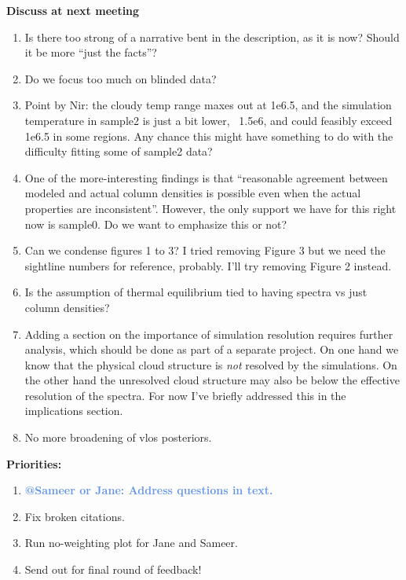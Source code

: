 \documentclass[fleqn,usenatbib]{mnras}
\makeatletter
\newcommand{\atsameer}[1]{\textcolor{CornflowerBlue}{\textbf{@Sameer or Jane: #1}}}
\makeatother
\begin{document}
\textbf{Discuss at next meeting}
\begin{enumerate}
    \item Is there too strong of a narrative bent in the description, as it is now? Should it be more ``just the facts''?
    \item Do we focus too much on blinded data?
    \item Point by Nir: the cloudy temp range maxes out at 1e6.5, and the simulation temperature in sample2 is just a bit lower, ~1.5e6, and could feasibly exceed 1e6.5 in some regions. Any chance this might have something to do with the difficulty fitting some of sample2 data?
    \item One of the more-interesting findings is that ``reasonable agreement between modeled and actual column densities is possible even when the actual properties are inconsistent''. However, the only support we have for this right now is sample0. Do we want to emphasize this or not?
    \item Can we condense figures 1 to 3? I tried removing Figure 3 but we need the sightline numbers for reference, probably. I'll try removing Figure 2 instead.
    \item Is the assumption of thermal equilibrium tied to having spectra vs just column densities?
    \item Adding a section on the importance of simulation resolution requires further analysis, which should be done as part of a separate project. On one hand we know that the physical cloud structure is \textit{not} resolved by the simulations. On the other hand the unresolved cloud structure may also be below the effective resolution of the spectra. For now I've briefly addressed this in the implications section.
    \item No more broadening of vlos posteriors.
\end{enumerate}

\textbf{Priorities:}
\begin{enumerate}
    \item \atsameer{Address questions in text.}
    \item Fix broken citations.
    \item Run no-weighting plot for Jane and Sameer.
    \item Send out for final round of feedback!
\end{enumerate}
\end{document}
